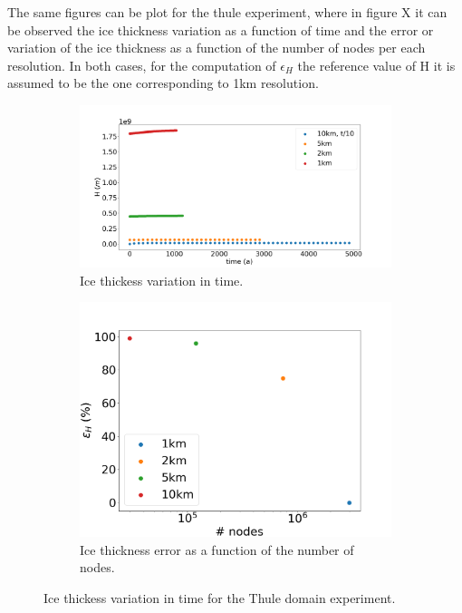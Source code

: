 \documentclass{article}
\begin{document}
The same figures can be plot for the thule experiment, where in figure X it can be observed the ice thickness variation as a function of time and the error or variation of the ice thickness as a function of the number of nodes per each resolution. In both cases, for the computation of $\epsilon_H$ the reference value of H it is assumed to be the one corresponding to 1km resolution. 

\begin{figure}[!h]
	\centering
	\begin{subfigure}{.5\textwidth}
		\centering
		\includegraphics[width=1.1\linewidth]{../fig/H_THULE_full_all_res_vs_time.png}
		\caption{Ice thickess variation in time.}
		\label{H_THULE_VS_TIME}
	\end{subfigure}%
	\begin{subfigure}{.5\textwidth}
		\centering
		\includegraphics[width=1.1\linewidth]{../fig/H_THULE_full_all_res_vs_num_nodes.png}
		\caption{Ice thickness error as a function of the number of nodes.}
		\label{H_THULE_VS_NODES}
	\end{subfigure}
	\caption{Ice thickess variation in time for the Thule domain experiment.}
	\label{H_THULE_VS_TIME_VS_NODES}
\end{figure}
\end{document}
